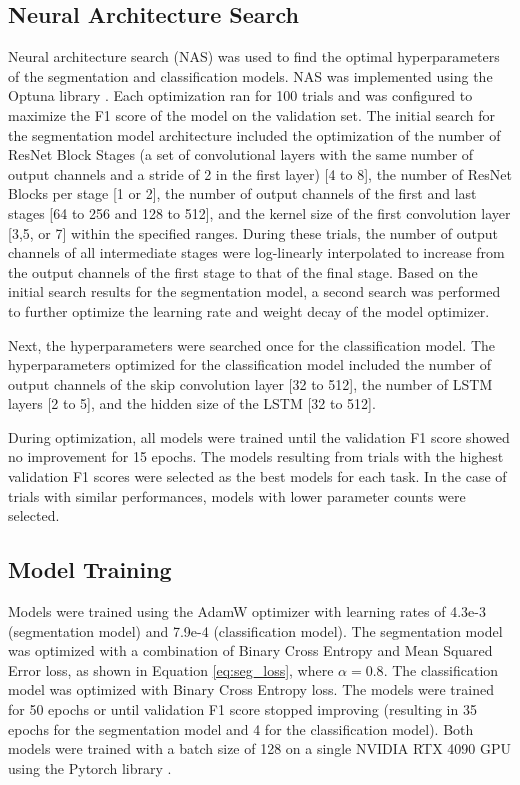 \documentclass[conference]{IEEEtran}
\begin{document}
\subsection{Neural Architecture Search}
Neural architecture search (NAS) was used to find the optimal hyperparameters of the segmentation and classification models. NAS was implemented using the Optuna library \cite{akiba_2019}. Each optimization ran for 100 trials and was configured to maximize the F1 score of the model on the validation set. The initial search for the segmentation model architecture included the optimization of the number of ResNet Block Stages (a set of convolutional layers with the same number of output channels and a stride of 2 in the first layer) [4 to 8], the number of ResNet Blocks per stage [1 or 2], the number of output channels of the first and last stages [64 to 256 and 128 to 512], and the kernel size of the first convolution layer [3,5, or 7] within the specified ranges. During these trials, the number of output channels of all intermediate stages were log-linearly interpolated to increase from the output channels of the first stage to that of the final stage. Based on the initial search results for the segmentation model, a second search was performed to further optimize the learning rate and weight decay of the model optimizer.

Next, the hyperparameters were searched once for the classification model. The hyperparameters optimized for the classification model included the number of output channels of the skip convolution layer [32 to 512], the number of LSTM layers [2 to 5], and the hidden size of the LSTM [32 to 512].

During optimization, all models were trained until the validation F1 score showed no improvement for 15 epochs. The models resulting from trials with the highest validation F1 scores were selected as the best models for each task. In the case of trials with similar performances, models with lower parameter counts were selected.

\subsection{Model Training}
Models were trained using the AdamW optimizer with learning rates of 4.3e-3 (segmentation model) and 7.9e-4 (classification model). The segmentation model was optimized with a combination of Binary Cross Entropy and Mean Squared Error loss, as shown in Equation \ref{eq:seg_loss}, where $\alpha=0.8$. The classification model was optimized with Binary Cross Entropy loss. The models were trained for 50 epochs or until validation F1 score stopped improving (resulting in 35 epochs for the segmentation model and 4 for the classification model). Both models were trained with a batch size of 128 on a single NVIDIA RTX 4090 GPU using the Pytorch library \cite{paszke_2019}. 
\end{document}
